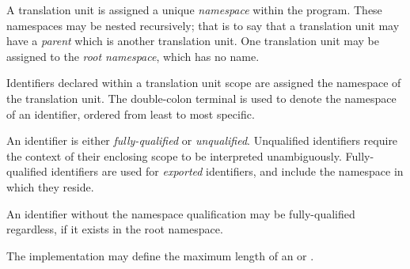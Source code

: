 \specsubitem
A translation unit is assigned a unique \textit{namespace} within the program.
These namespaces may be nested recursively; that is to say that a translation
unit may have a \textit{parent} which is another translation unit. One
translation unit may be assigned to the \textit{root namespace}, which has no
name.

\specsubitem
Identifiers declared within a translation unit scope are assigned the namespace
of the translation unit. The double-colon terminal \terminal{::} is used to
denote the namespace of an identifier, ordered from least to most specific.

\specsubitem
An identifier is either \textit{fully-qualified} or \textit{unqualified}.
Unqualified identifiers require the context of their enclosing scope to be
interpreted unambiguously. Fully-qualified identifiers are used for
\textit{exported} identifiers, and include the namespace in which they reside.


\specsubitem
An identifier without the namespace qualification may be fully-qualified
regardless, if it exists in the root namespace.

\specsubitem
The implementation may define the maximum length of an 
or .

